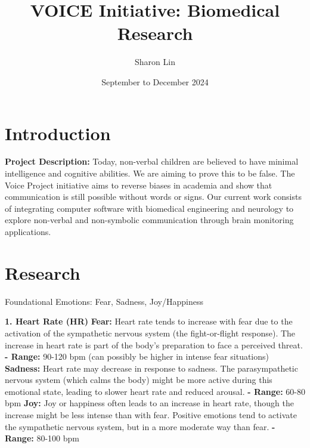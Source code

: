 \documentclass[12pt, research paper]{report}
\title{VOICE Initiative: Biomedical Research}
\author{Sharon Lin}
\date{September to December 2024}
\begin{document}
	
	\maketitle
	
	\section*{Introduction}
	
	\noindent\textbf{Project Description:} Today, non-verbal children are believed to have minimal intelligence and cognitive abilities. We are aiming to prove this to be false. The Voice Project initiative aims to reverse biases in academia and show that communication is still possible without words or signs. Our current work consists of integrating computer software with biomedical engineering and neurology to explore non-verbal and non-symbolic communication through brain monitoring applications.
	
	\vspace{10pt}
	
	\section*{Research} 
	Foundational Emotions: Fear, Sadness, Joy/Happiness

	\noindent \textbf{1. Heart Rate (HR)}
	\newline \textbf{Fear:} Heart rate tends to increase with fear due to the activation of the sympathetic nervous system (the fight-or-flight response). The increase in heart rate is part of the body's preparation to face a perceived threat. 
	\newline \textbf{- Range:} 90-120 bpm (can possibly be higher in intense fear situations)
	\newline \textbf{Sadness:} Heart rate may decrease in response to sadness. The parasympathetic nervous system (which calms the body) might be more active during this emotional state, leading to slower heart rate and reduced arousal.
	\newline \textbf{- Range:} 60-80 bpm
	\newline \textbf{Joy:} Joy or happiness often leads to an increase in heart rate, though the increase might be less intense than with fear. Positive emotions tend to activate the sympathetic nervous system, but in a more moderate way than fear.
	\newline \textbf{- Range:} 80-100 bpm
	\bigskip 
	
\end{document}
